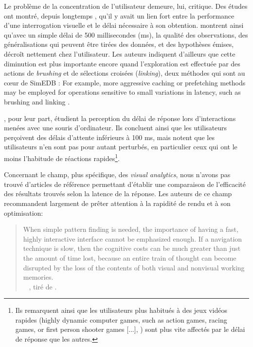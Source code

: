 Le problème de la concentration de l'utilisateur demeure, lui, critique.
Des études ont montré, depuis longtemps \autocite{mackenzie_lag_1993}, qu'il y avait un lien fort entre la performance d'une interrogation visuelle et le délai nécessaire à son obtention.
\cite[8]{liu_effects_2014} montrent ainsi qu'avec un simple délai de 500 millisecondes (ms), la qualité des observations, des généralisations qui peuvent être tirées des données, et des hypothèses émises, décroît nettement chez l'utilisateur.
Les auteurs indiquent d'ailleurs que cette diminution est plus importante encore quand l'exploration est effectuée par des actions de \textit{brushing} et de sélections croisées (\textit{linking}), deux méthodes qui sont au cœur de SimEDB : \og For example, more aggressive caching or prefetching methods may be employed for operations sensitive to small variations in latency, such as brushing and linking \fg{} \autocite[9]{liu_effects_2014}.

\cite{forch_are_2017}, pour leur part, étudient la perception du délai de réponse lors d'interactions menées avec une souris d'ordinateur.
Ils concluent ainsi que les utilisateurs perçoivent des délais d'attente inférieurs à 100 ms, mais notent que les utilisateurs n'en sont pas pour autant perturbés, en particulier ceux qui ont le moins l'habitude de réactions rapides\footnote{
	Ils remarquent ainsi que les utilisateurs plus habitués à des jeux vidéos rapides (\og highly dynamic computer games, such as action games, racing games, or first person shooter games [...]\fg{}, \cite[51]{forch_are_2017}) sont plus vite affectés par le délai de réponse que les autres.
}.

Concernant le champ, plus spécifique, des \textit{visual analytics}, nous n'avons pas trouvé d'articles de référence permettant d'établir une comparaison de l'efficacité des résultats trouvés selon la latence de la réponse.
Les auteurs de ce champ recommandent largement de prêter attention à la rapidité de rendu et à son optimisation:
\begin{quotation}
	\noindent \og
	When simple pattern finding is needed, the importance of having a fast, highly interactive interface cannot be emphasized	enough.
	If a navigation technique is slow, then the cognitive costs can be much greater than just the amount of time lost, because an entire train of thought can become disrupted by the loss of the contents of both visual and nonvisual working memories.
	\fg{}\\
	\mbox{}~ \hfill  \cite{ware_information_2012}, tiré de \cite[12]{amirpour_amraii_human-data_2018}.
\end{quotation}

